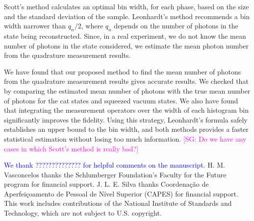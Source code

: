 \documentclass[
reprint,
superscriptaddress,
showpacs,
amsmath,
amssymb,
aps,
pra,
longbibliography
]{revtex4-1}
\providecommand{\aucmnt}[1]{#1}
\providecommand{\editcolor}[2]{\textcolor{#1}{#2}}
\providecommand{\aucmnt}[1]{}
\providecommand{\editcolor}[2]{#2}
\newcommand{\HV}[1]{\editcolor{blue}{#1}}
\newcommand{\SGc}[1]{\aucmnt{\editcolor{magenta}{[SG: #1]}}}
\begin{document}
Scott's method calculates an optimal bin width, for each phase, based
on the size and the standard deviation of the sample. Leonhardt's
method recommends a bin width narrower than $q_n/2$, where $q_n$ 
depends on the number of photons in the state being reconstructed. 
Since, in a real experiment, we do not know the mean number of photons 
in the state considered, we estimate the mean photon number from the quadrature
measurement results.

We have found that our proposed method to find the mean number of
photons from the quadrature measurement results gives accurate
results. We checked that by comparing the estimated mean number of
photons with the true mean number of photons for the
cat states and squeezed vacuum states. We also have found that 
integrating the measurement operators over the width of each histogram 
bin significantly improves the fidelity. Using this strategy, Leonhardt's 
formula safely establishes an upper bound to the bin width, and both 
methods provides a faster statistical estimation without losing too much 
information.  
\SGc{Do we have any cases in which Scott's method is really bad?}



\begin{acknowledgments}
  \HV{We thank ?????????????? for
    helpful comments on the manuscript.}  H. M. Vasconcelos thanks the
  Schlumberger Foundation's Faculty for the Future program for
  financial support. J. L. E. Silva thanks Coordena\c c\~ao de
  Aperfei\c coamento de Pessoal de N\'ivel Superior (CAPES) for
  financial support. This work includes contributions of the National
  Institute of Standards and Technology, which are not subject to
  U.S. copyright.
\end{acknowledgments}




%


\end{document}
